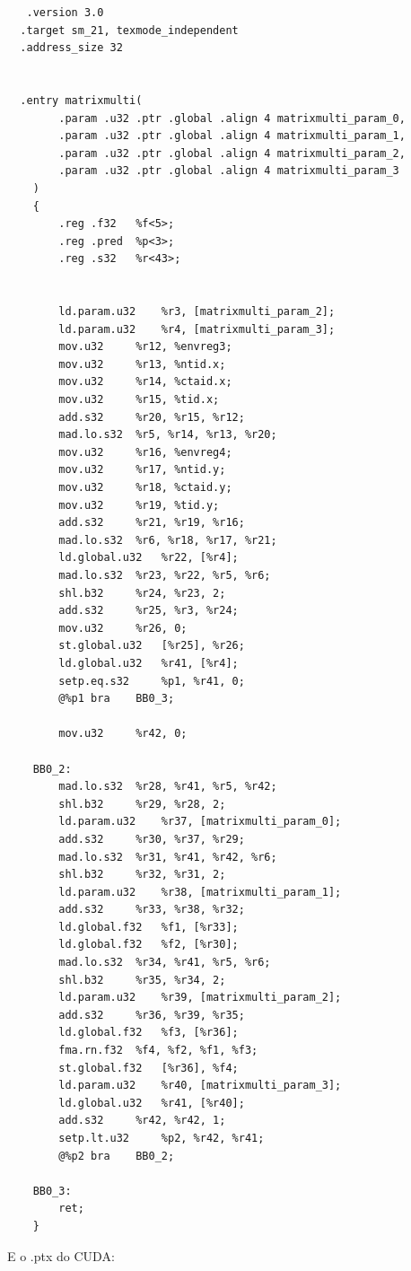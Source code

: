 \begin{lstlisting}
   .version 3.0
  .target sm_21, texmode_independent
  .address_size 32


  .entry matrixmulti(
	    .param .u32 .ptr .global .align 4 matrixmulti_param_0,
	    .param .u32 .ptr .global .align 4 matrixmulti_param_1,
	    .param .u32 .ptr .global .align 4 matrixmulti_param_2,
	    .param .u32 .ptr .global .align 4 matrixmulti_param_3
    )
    {
	    .reg .f32 	%f<5>;
	    .reg .pred 	%p<3>;
	    .reg .s32 	%r<43>;


	    ld.param.u32 	%r3, [matrixmulti_param_2];
	    ld.param.u32 	%r4, [matrixmulti_param_3];
	    mov.u32 	%r12, %envreg3;
	    mov.u32 	%r13, %ntid.x;
	    mov.u32 	%r14, %ctaid.x;
	    mov.u32 	%r15, %tid.x;
	    add.s32 	%r20, %r15, %r12;
	    mad.lo.s32 	%r5, %r14, %r13, %r20;
	    mov.u32 	%r16, %envreg4;
	    mov.u32 	%r17, %ntid.y;
	    mov.u32 	%r18, %ctaid.y;
	    mov.u32 	%r19, %tid.y;
	    add.s32 	%r21, %r19, %r16;
	    mad.lo.s32 	%r6, %r18, %r17, %r21;
	    ld.global.u32 	%r22, [%r4];
	    mad.lo.s32 	%r23, %r22, %r5, %r6;
	    shl.b32 	%r24, %r23, 2;
	    add.s32 	%r25, %r3, %r24;
	    mov.u32 	%r26, 0;
	    st.global.u32 	[%r25], %r26;
	    ld.global.u32 	%r41, [%r4];
	    setp.eq.s32 	%p1, %r41, 0;
	    @%p1 bra 	BB0_3;

	    mov.u32 	%r42, 0;

    BB0_2:
	    mad.lo.s32 	%r28, %r41, %r5, %r42;
	    shl.b32 	%r29, %r28, 2;
	    ld.param.u32 	%r37, [matrixmulti_param_0];
	    add.s32 	%r30, %r37, %r29;
	    mad.lo.s32 	%r31, %r41, %r42, %r6;
	    shl.b32 	%r32, %r31, 2;
	    ld.param.u32 	%r38, [matrixmulti_param_1];
	    add.s32 	%r33, %r38, %r32;
	    ld.global.f32 	%f1, [%r33];
	    ld.global.f32 	%f2, [%r30];
	    mad.lo.s32 	%r34, %r41, %r5, %r6;
	    shl.b32 	%r35, %r34, 2;
	    ld.param.u32 	%r39, [matrixmulti_param_2];
	    add.s32 	%r36, %r39, %r35;
	    ld.global.f32 	%f3, [%r36];
	    fma.rn.f32 	%f4, %f2, %f1, %f3;
	    st.global.f32 	[%r36], %f4;
	    ld.param.u32 	%r40, [matrixmulti_param_3];
	    ld.global.u32 	%r41, [%r40];
	    add.s32 	%r42, %r42, 1;
	    setp.lt.u32 	%p2, %r42, %r41;
	    @%p2 bra 	BB0_2;

    BB0_3:
	    ret;
    }
\end{lstlisting}

E o .ptx do CUDA:


